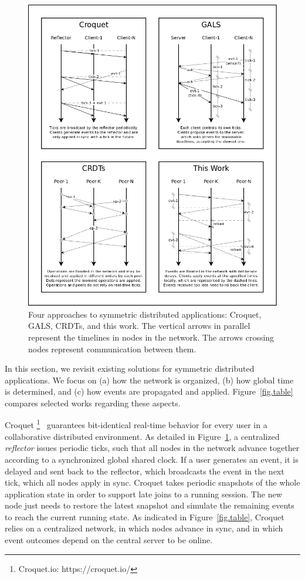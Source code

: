 \documentclass[10pt,journal,compsoc]{IEEEtran}
\begin{document}
\begin{figure}[p]
  \centering
  \includegraphics[width=\linewidth]{algos}
  \caption{
    \label{fig.algos}
    Four approaches to symmetric distributed applications: Croquet, GALS,
    CRDTs, and this work.
    The vertical arrows in parallel represent the timelines in nodes in the
    network.
    The arrows crossing nodes represent communication between them.
  }
\end{figure}

In this section, we revisit existing solutions for symmetric distributed
applications.
We focus on
    (a) how the network is organized,
    (b) how global time is determined, and
    (c) how events are propagated and applied.
Figure~\ref{fig.table} compares selected works regarding these aspects.

Croquet%
\footnote{Croquet.io: https://croquet.io/}~\cite{croquet} guarantees
bit-identical real-time behavior for every user in a collaborative
distributed environment.
%
As detailed in Figure~\ref{fig.algos}, a centralized \emph{reflector} issues
periodic ticks, such that all nodes in the network advance together according
to a synchronized global shared clock.
If a user generates an event, it is delayed and sent back to the reflector,
which broadcasts the event in the next tick, which all nodes apply in sync.
%
Croquet takes periodic snapshots of the whole application state in order to
support late joins to a running session.
The new node just needs to restore the latest snapshot and simulate the
remaining events to reach the current running state.
%
As indicated in Figure~\ref{fig.table}, Croquet relies on a centralized
network, in which nodes advance in sync, and in which event outcomes depend
on the central server to be online.
\end{document}
